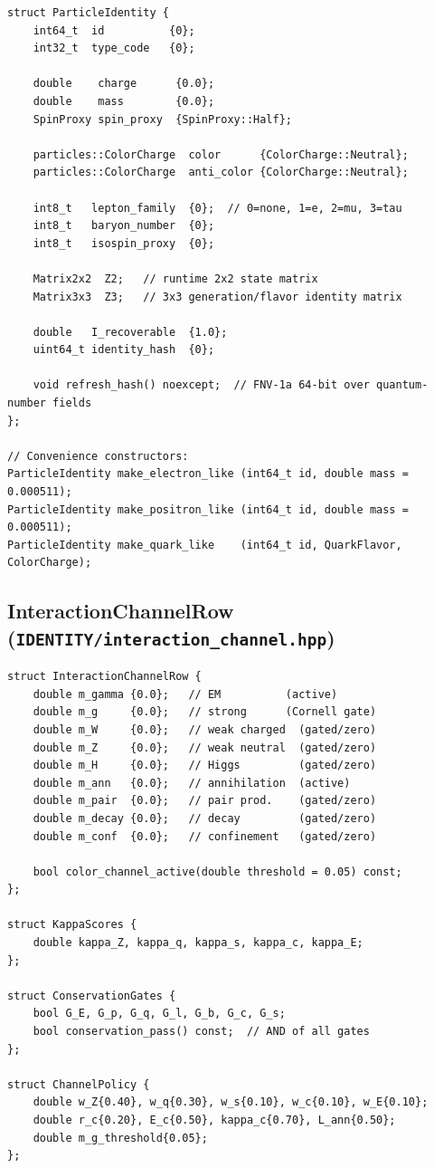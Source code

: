 \documentclass[11pt,a4paper]{article}
\theoremstyle{defbox}
\begin{document}
\begin{lstlisting}[caption={ParticleIdentity struct.}]
struct ParticleIdentity {
	int64_t  id          {0};
	int32_t  type_code   {0};

	double    charge      {0.0};
	double    mass        {0.0};
	SpinProxy spin_proxy  {SpinProxy::Half};

	particles::ColorCharge  color      {ColorCharge::Neutral};
	particles::ColorCharge  anti_color {ColorCharge::Neutral};

	int8_t   lepton_family  {0};  // 0=none, 1=e, 2=mu, 3=tau
	int8_t   baryon_number  {0};
	int8_t   isospin_proxy  {0};

	Matrix2x2  Z2;   // runtime 2x2 state matrix
	Matrix3x3  Z3;   // 3x3 generation/flavor identity matrix

	double   I_recoverable  {1.0};
	uint64_t identity_hash  {0};

	void refresh_hash() noexcept;  // FNV-1a 64-bit over quantum-number fields
};

// Convenience constructors:
ParticleIdentity make_electron_like (int64_t id, double mass = 0.000511);
ParticleIdentity make_positron_like (int64_t id, double mass = 0.000511);
ParticleIdentity make_quark_like    (int64_t id, QuarkFlavor, ColorCharge);
\end{lstlisting}

\subsection{InteractionChannelRow (\texttt{IDENTITY/interaction\_channel.hpp})}

\begin{lstlisting}[caption={Nine-channel row and associated types.}]
struct InteractionChannelRow {
	double m_gamma {0.0};   // EM          (active)
	double m_g     {0.0};   // strong      (Cornell gate)
	double m_W     {0.0};   // weak charged  (gated/zero)
	double m_Z     {0.0};   // weak neutral  (gated/zero)
	double m_H     {0.0};   // Higgs         (gated/zero)
	double m_ann   {0.0};   // annihilation  (active)
	double m_pair  {0.0};   // pair prod.    (gated/zero)
	double m_decay {0.0};   // decay         (gated/zero)
	double m_conf  {0.0};   // confinement   (gated/zero)

	bool color_channel_active(double threshold = 0.05) const;
};

struct KappaScores {
	double kappa_Z, kappa_q, kappa_s, kappa_c, kappa_E;
};

struct ConservationGates {
	bool G_E, G_p, G_q, G_l, G_b, G_c, G_s;
	bool conservation_pass() const;  // AND of all gates
};

struct ChannelPolicy {
	double w_Z{0.40}, w_q{0.30}, w_s{0.10}, w_c{0.10}, w_E{0.10};
	double r_c{0.20}, E_c{0.50}, kappa_c{0.70}, L_ann{0.50};
	double m_g_threshold{0.05};
};
\end{lstlisting}
\end{document}
